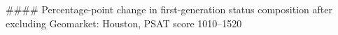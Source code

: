 #### Percentage-point change in first-generation status composition after excluding Geomarket: Houston, PSAT score 1010–1520
